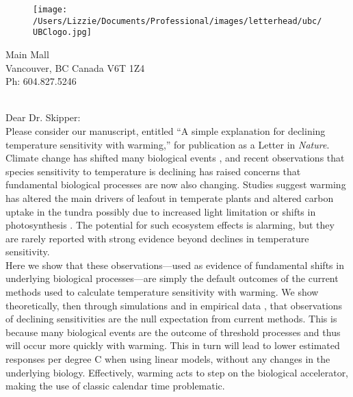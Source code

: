 \documentclass[11pt,a4paper]{article}
\begin{document}

\begin{figure}[htbp]
\hspace*{14cm}                                                           
\texttt{[image: /Users/Lizzie/Documents/Professional/images/letterhead/ubc/UBClogo.jpg]}
\end{figure}
\vspace{-10ex}
\begin{small}
 Main Mall \\
\noindent Vancouver, BC Canada V6T 1Z4\\
\noindent Ph: 604.827.5246\\
\end{small}
\vspace{2ex}\\
\noindent Dear Dr. Skipper:
\vspace{1.5ex}\\
Please consider our manuscript, entitled ``A simple explanation for declining temperature sensitivity with warming,'' for publication as a Letter in \emph{Nature}. 
\vspace{1.5ex}\\
Climate change has shifted many biological events \citep{IPCC:2014sm}, and recent observations that species sensitivity to temperature is declining has raised concerns that fundamental biological processes are now also changing. Studies suggest warming has altered the main drivers of leafout in temperate plants \citep{fu2015,gusewell2017,Samplonius:2018aa,vitasse2018} and altered carbon uptake in the tundra possibly due to increased light limitation or shifts in photosynthesis \citep{piao2017,Zhu2019}. The potential for such ecosystem effects is alarming, but they are rarely reported with strong evidence beyond declines in temperature sensitivity.
\vspace{1.5ex}\\
Here we show that these observations---used as evidence of fundamental shifts in underlying biological processes---are simply the default outcomes of the  current methods used to calculate temperature sensitivity with warming. We show theoretically, then through simulations and in empirical data \citep[using the same dataset used in][]{fu2015}, that observations of declining sensitivities are the null expectation from current methods. This is because many biological events are the outcome of threshold processes and thus will occur more quickly with warming. This in turn will lead to lower estimated responses per degree C when using linear models, without any changes in the underlying biology. Effectively, warming acts to step on the biological accelerator, making the use of classic calendar time problematic. 
\end{document}
